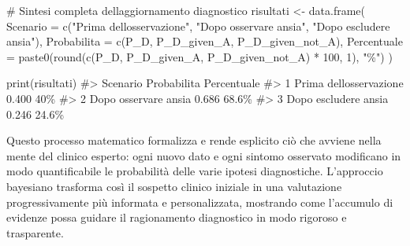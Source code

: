 \documentclass[
  letterpaper,
  DIV=11,
  numbers=noendperiod,
  oneside]{scrreprt}
\newenvironment{Shaded}{\begin{snugshade}}{\end{snugshade}}
\newcommand{\AttributeTok}[1]{\textcolor[rgb]{0.40,0.45,0.13}{#1}}
\newcommand{\CommentTok}[1]{\textcolor[rgb]{0.37,0.37,0.37}{#1}}
\newcommand{\DecValTok}[1]{\textcolor[rgb]{0.68,0.00,0.00}{#1}}
\newcommand{\FunctionTok}[1]{\textcolor[rgb]{0.28,0.35,0.67}{#1}}
\newcommand{\NormalTok}[1]{\textcolor[rgb]{0.00,0.23,0.31}{#1}}
\newcommand{\OtherTok}[1]{\textcolor[rgb]{0.00,0.23,0.31}{#1}}
\newcommand{\SpecialCharTok}[1]{\textcolor[rgb]{0.37,0.37,0.37}{#1}}
\newcommand{\StringTok}[1]{\textcolor[rgb]{0.13,0.47,0.30}{#1}}
\theoremstyle{definition}
\theoremstyle{plain}
\theoremstyle{definition}
\theoremstyle{remark}
\begin{document}
\begin{tcolorbox}
\begin{Shaded}
\begin{Highlighting}[]
\CommentTok{\# Sintesi completa dell\textquotesingle{}aggiornamento diagnostico}
\NormalTok{risultati }\OtherTok{\textless{}{-}} \FunctionTok{data.frame}\NormalTok{(}
  \AttributeTok{Scenario =} \FunctionTok{c}\NormalTok{(}\StringTok{"Prima dell\textquotesingle{}osservazione"}\NormalTok{, }
               \StringTok{"Dopo osservare ansia"}\NormalTok{,}
               \StringTok{"Dopo escludere ansia"}\NormalTok{),}
  \AttributeTok{Probabilita =} \FunctionTok{c}\NormalTok{(P\_D, P\_D\_given\_A, P\_D\_given\_not\_A),}
  \AttributeTok{Percentuale =} \FunctionTok{paste0}\NormalTok{(}\FunctionTok{round}\NormalTok{(}\FunctionTok{c}\NormalTok{(P\_D, P\_D\_given\_A, P\_D\_given\_not\_A) }\SpecialCharTok{*} \DecValTok{100}\NormalTok{, }\DecValTok{1}\NormalTok{), }\StringTok{"\%"}\NormalTok{)}
\NormalTok{)}

\FunctionTok{print}\NormalTok{(risultati)}
\CommentTok{\#\textgreater{}                  Scenario Probabilita Percentuale}
\CommentTok{\#\textgreater{} 1 Prima dell\textquotesingle{}osservazione       0.400         40\%}
\CommentTok{\#\textgreater{} 2    Dopo osservare ansia       0.686       68.6\%}
\CommentTok{\#\textgreater{} 3    Dopo escludere ansia       0.246       24.6\%}
\end{Highlighting}
\end{Shaded}

Questo processo matematico formalizza e rende esplicito ciò che avviene
nella mente del clinico esperto: ogni nuovo dato e ogni sintomo
osservato modificano in modo quantificabile le probabilità delle varie
ipotesi diagnostiche. L'approccio bayesiano trasforma così il sospetto
clinico iniziale in una valutazione progressivamente più informata e
personalizzata, mostrando come l'accumulo di evidenze possa guidare il
ragionamento diagnostico in modo rigoroso e trasparente.

\end{tcolorbox}
\end{document}
